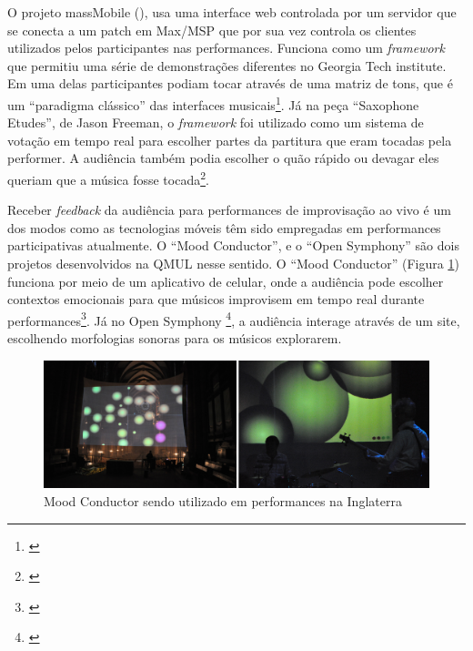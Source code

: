 O projeto massMobile (\citeyear{Weitzner2012}), usa uma interface web controlada por um servidor que se conecta a um patch em Max/MSP que por sua vez controla os clientes utilizados pelos participantes nas performances. Funciona como um \emph{framework} que permitiu uma série de demonstrações diferentes no Georgia Tech institute. Em uma delas participantes podiam tocar através de uma matriz de tons, que é um ``paradigma clássico'' das interfaces musicais\footnote{\cite{Weitzner2012}}. Já na peça ``Saxophone Etudes'', de Jason Freeman, o \emph{framework} foi utilizado como um sistema de votação em tempo real para escolher partes da partitura que eram tocadas pela performer. A audiência também podia escolher o quão rápido ou devagar eles queriam que a música fosse tocada\footnote{\cite{Freeman}}.  



Receber \emph{feedback} da audiência para performances de improvisação ao vivo é um dos modos como as tecnologias móveis têm sido empregadas em performances participativas atualmente. O ``Mood Conductor'', e o ``Open Symphony'' são dois projetos desenvolvidos na QMUL nesse sentido. O ``Mood Conductor'' (Figura \ref{moodconductor}) funciona por meio de um aplicativo de celular, onde a audiência pode escolher contextos emocionais para que músicos improvisem em tempo real durante performances\footnote{\cite{Fazekas:2014}}. Já no Open Symphony \footnote{\cite{wu2017open}}, a audiência interage através de um site, escolhendo morfologias sonoras para os músicos explorarem. 

\begin{figure}
    \caption{\label{moodconductor}Mood Conductor sendo utilizado em performances na Inglaterra}
    \begin{center}
        \includegraphics[width=1\linewidth]{pictures/cap3/moodconductor}
    \end{center}
\end{figure}

